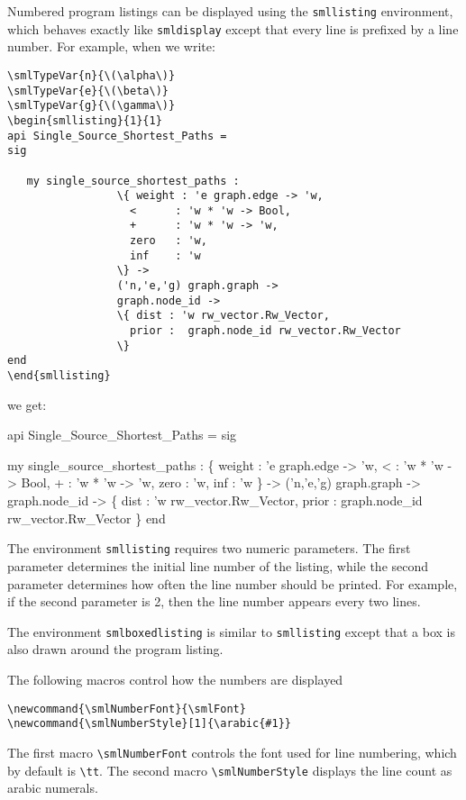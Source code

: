 Numbered program listings can be displayed using the
\verb|smllisting| environment, which behaves exactly like
\verb|smldisplay| except that every line is prefixed by a
line number.  For example, when we write:
\begin{verbatim}
\smlTypeVar{n}{\(\alpha\)}
\smlTypeVar{e}{\(\beta\)}
\smlTypeVar{g}{\(\gamma\)}
\begin{smllisting}{1}{1}
api Single_Source_Shortest_Paths =
sig

   my single_source_shortest_paths :
                 \{ weight : 'e graph.edge -> 'w,
                   <      : 'w * 'w -> Bool,
                   +      : 'w * 'w -> 'w,
                   zero   : 'w,
                   inf    : 'w
                 \} ->
                 ('n,'e,'g) graph.graph ->
                 graph.node_id ->
                 \{ dist : 'w rw_vector.Rw_Vector,
                   prior :  graph.node_id rw_vector.Rw_Vector
                 \}
end
\end{smllisting}
\end{verbatim}
\noindent we get:
\begin{smllisting}{1}{1}
api Single_Source_Shortest_Paths =
sig

   my single_source_shortest_paths :
                 \{ weight : 'e graph.edge -> 'w,
                   <      : 'w * 'w -> Bool,
                   +      : 'w * 'w -> 'w,
                   zero   : 'w,
                   inf    : 'w
                 \} ->
                 ('n,'e,'g) graph.graph ->
                 graph.node_id ->
                 \{ dist : 'w rw_vector.Rw_Vector,
                   prior :  graph.node_id rw_vector.Rw_Vector
                 \}
end
\end{smllisting}

The environment \verb|smllisting| requires two numeric parameters.
The first parameter determines the initial line number of the
listing, while the second parameter determines how often the line
number should be printed.  For example, if the second parameter
is 2, then the line number appears every two lines. 

The environment \verb|smlboxedlisting| is similar to 
\verb|smllisting| except that a box is also drawn around the program
listing.

The following macros control how the numbers are displayed
\begin{verbatim}
\newcommand{\smlNumberFont}{\smlFont}
\newcommand{\smlNumberStyle}[1]{\arabic{#1}}
\end{verbatim}
The first macro \verb|\smlNumberFont| controls the font used
for line numbering, which by default is \verb|\tt|.  
The second macro \verb|\smlNumberStyle| displays the line count as
arabic numerals.  

